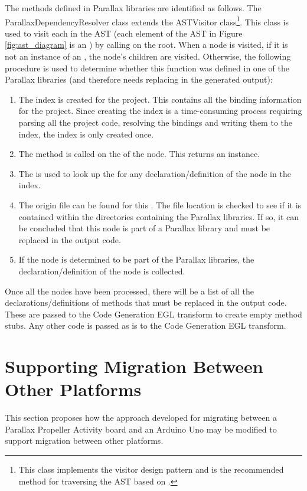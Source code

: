 \documentclass{UoYCSproject}
\begin{document}
The methods defined in Parallax libraries are identified as follows. The ParallaxDependencyResolver class extends the ASTVisitor class\footnote{This class implements the visitor design pattern and is the recommended method for traversing the AST based on \parencite{cdt_parsing}.}.  This class is used to visit each  in the AST (each element of the AST in Figure \ref{fig:ast_diagram} is an ) by calling  on the root. When a node is visited, if it is not an instance of an , the node's children are visited. Otherwise, the following procedure is used to determine whether this function was defined in one of the Parallax libraries (and therefore needs replacing in the generated output):
\begin{enumerate}
\item The index is created for the project. This contains all the binding information for the project. Since creating the index is a time-consuming process requiring parsing all the project code, resolving the bindings and writing them to the index, the index is only created once.
\item The  method is called on the  of the node. This returns an  instance.
\item The  is used to look up the  for any declaration/definition of the node in the index.
\item The origin file can be found for this . The file location is checked to see if it is contained within the directories containing the Parallax libraries. If so, it can be concluded that this node is part of a Parallax library and must be replaced in the output code.
\item If the node is determined to be part of the Parallax libraries, the declaration/definition of the node is collected.
\end{enumerate}

Once all the nodes have been processed, there will be a list of all the declarations/definitions of methods that must be replaced in the output code. These are passed to the Code Generation EGL transform to create empty method stubs. Any other code is passed as is to the Code Generation EGL transform.

\section{Supporting Migration Between Other Platforms} \label{how_to_modify}
This section proposes how the approach developed for migrating between a Parallax Propeller Activity board and an Arduino Uno may be modified to support migration between other platforms.
\end{document}
